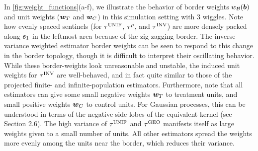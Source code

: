     In \autoref{fig:weight_functions}(a-f), we illustrate the behavior of border weights \(w_{\mathcal{B}}(\bm{b})\) and unit weights (\(\bm{w}_{T}\) and \(\bm{w}_{C}\)) in this simulation setting with 3 wiggles.
Note how evenly spaced sentinels (for \(\tau^{\mathrm{UNIF}}\), \(\tau^{\rho}\), and \(\tau^{\mathrm{INV}}\)) are more densely packed along \(\bm{s}_1\) in the leftmost area because of the zig-zagging border.
The inverse-variance weighted estimator border weights can be seen to respond to this change in the border topology, though it is difficult to interpret their oscillating behavior.
While these border-weights look unreasonable and unstable, the induced unit weights for \(\tau^{\mathrm{INV}}\) are well-behaved, and in fact quite similar to those of the projected finite- and infinite-population estimators.
Furthermore, note that all estimators can give some small negative weights \(\bm{w}_{T}\) to treatment units, and small positive weights \(\bm{w}_{C}\) to control units.
For Gaussian processes, this can be understood in terms of the negative side-lobes of the equivalent kernel (see \cite{rasmussen2006gaussian} Section 2.6).
The high variance of \(\tau^{\mathrm{UNIF}}\) and \(\tau^{\mathrm{GEO}}\) manifests itself as large weights given to a small number of units.
All other estimators spread the weights more evenly among the units near the border, which reduces their variance.

